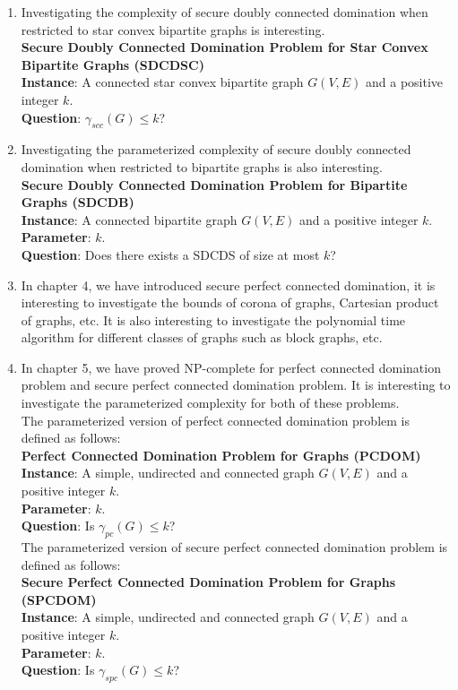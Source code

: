 \begin{enumerate}
\item
Investigating the complexity of secure doubly connected domination when restricted to star convex bipartite graphs is interesting.\\
\textbf{Secure Doubly Connected Domination Problem for Star Convex Bipartite Graphs (SDCDSC)}\\
\indent \textbf{Instance}: A connected star convex bipartite graph $G(V,E)$ and a positive integer $k$.\\
\indent \textbf{Question}: $\gamma_{scc}(G) \leq k$? 
\item
Investigating the parameterized complexity of secure doubly connected domination when restricted to bipartite graphs is also interesting. \\
\textbf{Secure Doubly Connected Domination Problem for Bipartite Graphs (SDCDB)}\\
\indent \textbf{Instance}: A connected bipartite graph $G(V,E)$ and a positive integer $k$.\\
\indent \textbf{Parameter}: $k$. \\
\indent \textbf{Question}: Does there exists a SDCDS of size at most $k$? 
\item 
In chapter 4, we have introduced secure perfect connected domination, it is interesting to investigate the bounds of corona of graphs, Cartesian product of graphs, etc. It is also interesting to investigate the polynomial time algorithm for different classes of graphs such as block graphs, etc.
\item
In chapter 5, we have proved NP-complete for perfect connected domination problem and secure perfect connected domination problem. It is interesting to investigate the parameterized complexity for both of these problems.\smallskip \\ 
The parameterized version of perfect connected domination problem is defined as follows:\\
\textbf{Perfect Connected Domination Problem for Graphs (PCDOM)}\\
\indent \textbf{Instance}: A simple, undirected and connected graph $G(V,E)$ and a positive integer $k$.\\
\indent \textbf{Parameter}: $k$. \\
\indent \textbf{Question}: Is $\gamma_{pc}(G) \leq k$? \smallskip \\
The parameterized version of secure perfect connected domination problem is defined as follows:\\
\textbf{Secure Perfect Connected Domination Problem for Graphs (SPCDOM)}\\
\indent \textbf{Instance}: A simple, undirected and connected graph $G(V,E)$ and a positive integer $k$.\\
\indent \textbf{Parameter}: $k$. \\
\indent \textbf{Question}: Is $\gamma_{spc}(G) \leq k$? 

\end{enumerate}

